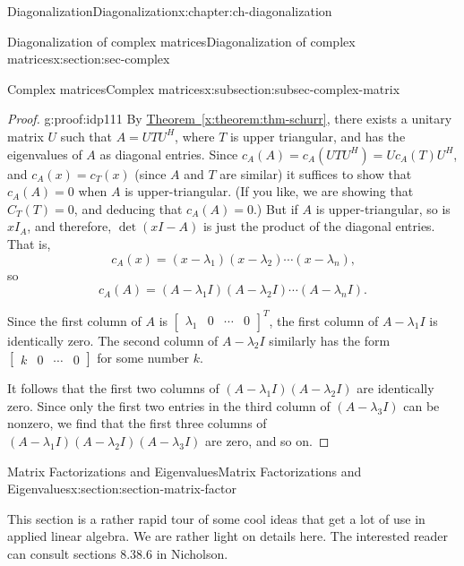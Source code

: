 \documentclass[oneside,10pt,]{book}
\newcommand{\xreffont}{\relax}
\numberwithin{equation}{section}
\newcommand{\bbm}{\begin{bmatrix}}
\newcommand{\ebm}{\end{bmatrix}}
\newcommand{\amp}{&}
\begin{document}
\begin{chapterptx}{Diagonalization}{}{Diagonalization}{}{}{x:chapter:ch-diagonalization}
\begin{sectionptx}{Diagonalization of complex matrices}{}{Diagonalization of complex matrices}{}{}{x:section:sec-complex}
\begin{subsectionptx}{Complex matrices}{}{Complex matrices}{}{}{x:subsection:subsec-complex-matrix}
\begin{proof}{}{g:proof:idp111}
By \hyperref[x:theorem:thm-schurr]{Theorem~{\xreffont\ref{x:theorem:thm-schurr}}}, there exists a unitary matrix \(U\) such that \(A = UTU^H\), where \(T\) is upper triangular, and has the eigenvalues of \(A\) as diagonal entries. Since \(c_A(A)=c_A(UTU^H)=Uc_A(T)U^H\), and \(c_A(x)=c_T(x)\) (since \(A\) and \(T\) are similar) it suffices to show that \(c_A(A)=0\) when \(A\) is upper-triangular. (If you like, we are showing that \(C_T(T)=0\), and deducing that \(c_A(A)=0\).) But if \(A\) is upper-triangular, so is \(xI_A\), and therefore, \(\det(xI-A)\) is just the product of the diagonal entries. That is,%
\begin{equation*}
c_A(x) = (x-\lambda_1)(x-\lambda_2)\cdots (x-\lambda_n)\text{,}
\end{equation*}
so%
\begin{equation*}
c_A(A) = (A-\lambda_1I)(A-\lambda_2I)\cdots (A-\lambda_nI)\text{.}
\end{equation*}
%
\par
Since the first column of \(A\) is \(\bbm \lambda_1\amp 0 \amp \cdots \amp 0\ebm^T\), the first column of \(A-\lambda_1I\) is identically zero. The second column of \(A-\lambda_2I\) similarly has the form \(\bbm k\amp 0\amp\cdots\amp 0\ebm\) for some number \(k\).%
\par
It follows that the first two columns of \((A-\lambda_1I)(A-\lambda_2I)\) are identically zero. Since only the first two entries in the third column of \((A-\lambda_3I)\) can be nonzero, we find that the first three columns of \((A-\lambda_1I)(A-\lambda_2I)(A-\lambda_3I)\) are zero, and so on.%
\end{proof}
\end{subsectionptx}
\end{sectionptx}
%
%
\typeout{************************************************}
\typeout{************************************************}
%
\begin{sectionptx}{Matrix Factorizations and Eigenvalues}{}{Matrix Factorizations and Eigenvalues}{}{}{x:section:section-matrix-factor}
\begin{introduction}{}%
This section is a rather rapid tour of some cool ideas that get a lot of use in applied linear algebra. We are rather light on details here. The interested reader can consult sections 8.3\textendash{}8.6 in Nicholson.%
\end{introduction}%
%
%
\typeout{************************************************}

\end{sectionptx}
\end{chapterptx}
\end{document}
